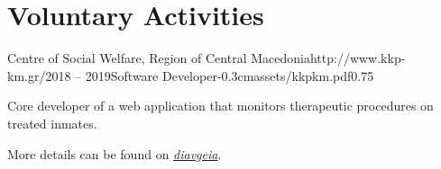 \documentclass{mycv}
\begin{document}
	\section{Voluntary Activities}
	\begin{EntryDatedLogo}{Centre of Social Welfare, Region of Central Macedonia}{http://www.kkp-km.gr/}{2018 -- 2019}{Software Developer}{-0.3cm}{assets/kkpkm.pdf}{0.75}
		\begin{Itemize}
			\item Core developer of a web application that monitors therapeutic procedures on treated inmates.
			\item More details can be found on \href{https://diavgeia.gov.gr/decision/view/\%CE\%A8\%CE\%A6\%CE\%A1\%CE\%93\%CE\%9F\%CE\%9E\%CE\%A7\%CE\%A3-\%CE\%A0\%CE\%93\%CE\%A6}{\textit{diavgeia}}.
		\end{Itemize}
	\end{EntryDatedLogo}
\end{document}

